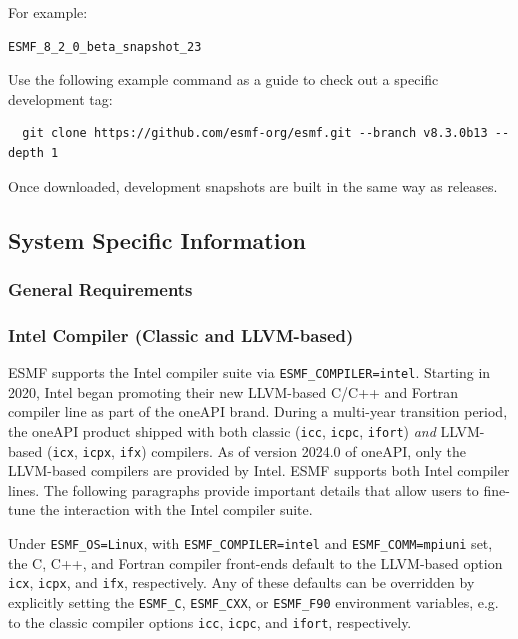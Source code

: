 For example:
\begin{verbatim}
ESMF_8_2_0_beta_snapshot_23
\end{verbatim}

Use the following example command as a guide to check out a specific development tag:

\begin{verbatim}
  git clone https://github.com/esmf-org/esmf.git --branch v8.3.0b13 --depth 1
\end{verbatim}

Once downloaded, development snapshots are built in the same way as releases.

\subsection{System Specific Information}

\subsubsection{General Requirements}
\label{sec:systemreq}


\subsubsection{Intel Compiler (Classic and LLVM-based)}

ESMF supports the Intel compiler suite via {\tt ESMF\_COMPILER=intel}. Starting in 2020, Intel began promoting their new LLVM-based C/C++ and Fortran compiler line as part of the oneAPI brand. During a multi-year transition period, the oneAPI product shipped with both classic ({\tt icc}, {\tt icpc}, {\tt ifort}) {\em and} LLVM-based ({\tt icx}, {\tt icpx}, {\tt ifx}) compilers. As of version 2024.0 of oneAPI, only the LLVM-based compilers are provided by Intel. ESMF supports both Intel compiler lines. The following paragraphs provide important details that allow users to fine-tune the interaction with the Intel compiler suite.

Under {\tt ESMF\_OS=Linux}, with {\tt ESMF\_COMPILER=intel} and {\tt ESMF\_COMM=mpiuni} set, the C, C++, and Fortran compiler front-ends default to the LLVM-based option {\tt icx}, {\tt icpx}, and {\tt ifx}, respectively. Any of these defaults can be overridden by explicitly setting the {\tt ESMF\_C}, {\tt ESMF\_CXX}, or {\tt ESMF\_F90} environment variables, e.g. to the classic compiler options {\tt icc}, {\tt icpc}, and {\tt ifort}, respectively.

